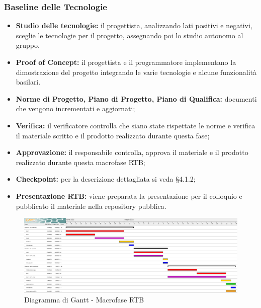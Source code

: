 \subsubsection{Baseline delle Tecnologie}
\begin{itemize}
    \item \textbf{Studio delle tecnologie:} il progettista, analizzando lati positivi e negativi, sceglie le tecnologie per il progetto, assegnando poi lo studio autonomo al gruppo.
    \item \textbf{Proof of Concept:} il progettista e il programmatore implementano la dimostrazione del progetto integrando le varie tecnologie e alcune funzionalità basilari.
    \item \textbf{Norme di Progetto, Piano di Progetto, Piano di Qualifica:} documenti che vengono incrementati e aggiornati;
    \item \textbf{Verifica:} il verificatore controlla che siano state rispettate le norme e verifica il materiale scritto e il prodotto realizzato durante questa fase;
    \item \textbf{Approvazione:} il responsabile controlla, approva il materiale e il prodotto realizzato durante questa macrofase RTB;
    \item \textbf{Checkpoint:} per la descrizione dettagliata si veda §4.1.2;
    \item \textbf{Presentazione RTB:} viene preparata la presentazione per il colloquio e pubblicato il materiale nella repository pubblica.
\end{itemize}


\begin{landscape}
	\begin{figure}
	\includegraphics[width=\linewidth]{images/RTB.png}
    \caption{Diagramma di Gantt - Macrofase RTB}
	\end{figure}
\end{landscape}

\newpage
